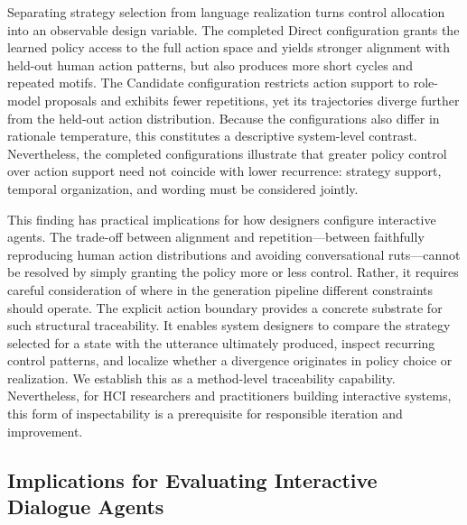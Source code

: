 \documentclass[manuscript,review,anonymous]{acmart}
\begin{document}
Separating strategy selection from language realization turns control
allocation into an observable design variable. The completed Direct
configuration grants the learned policy access to the full action space and
yields stronger alignment with held-out human action patterns, but also
produces more short cycles and repeated motifs. The Candidate configuration
restricts action support to role-model proposals and exhibits fewer
repetitions, yet its trajectories diverge further from the held-out action
distribution. Because the configurations also differ in rationale temperature,
this constitutes a descriptive system-level contrast. Nevertheless, the
completed configurations illustrate that greater policy control over action
support need not coincide with lower recurrence: strategy support, temporal
organization, and wording must be considered jointly.

This finding has practical implications for how designers configure interactive
agents. The trade-off between alignment and repetition---between faithfully
reproducing human action distributions and avoiding conversational ruts---cannot
be resolved by simply granting the policy more or less control. Rather, it
requires careful consideration of where in the generation pipeline different
constraints should operate. The explicit action boundary provides a concrete
substrate for such structural traceability. It enables system designers to
compare the strategy selected for a state with the utterance ultimately
produced, inspect recurring control patterns, and localize whether a divergence
originates in policy choice or realization. We establish this as a method-level
traceability capability. Nevertheless, for HCI researchers and practitioners
building interactive systems, this form of inspectability is a prerequisite for
responsible iteration and improvement.

\subsection{Implications for Evaluating Interactive Dialogue Agents}
\end{document}
